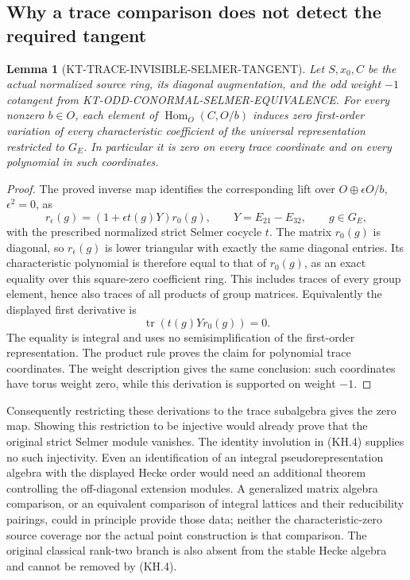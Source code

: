 \documentclass[11pt,a4paper]{article}
\newtheorem{lemma}[theorem]{Lemma}
\theoremstyle{definition}
\begin{document}
\subsection{Why a trace comparison does not detect the required tangent}

\begin{lemma}[KT-TRACE-INVISIBLE-SELMER-TANGENT]
Let $S,x_0,C$ be the actual normalized source ring, its diagonal
augmentation, and the odd weight $-1$ cotangent from
KT-ODD-CONORMAL-SELMER-EQUIVALENCE.  For every nonzero $b\in O$,
each element of $\operatorname{Hom}_O(C,O/b)$ induces zero
first-order variation of every characteristic coefficient of
the universal representation restricted to $G_E$.  In particular
it is zero on every trace coordinate and on every polynomial
in such coordinates.
\end{lemma}
\begin{proof}
The proved inverse map identifies the corresponding lift over
$O\oplus\epsilon O/b$, $\epsilon^2=0$, as
\[
 r_\epsilon(g)=(1+\epsilon t(g)Y)r_0(g),\qquad
 Y=E_{21}-E_{32},\qquad g\in G_E,                           \tag{KH.6}
\]
with the prescribed normalized strict Selmer cocycle $t$.
The matrix $r_0(g)$ is diagonal, so $r_\epsilon(g)$ is lower
triangular with exactly the same diagonal entries.  Its
characteristic polynomial is therefore equal to that of
$r_0(g)$, as an exact equality over this square-zero coefficient
ring.  This includes traces of every group element, hence also
traces of all products of group matrices.  Equivalently the
displayed first derivative is
\[
             \operatorname{tr}(t(g)Y r_0(g))=0.            \tag{KH.7}
\]
The equality is integral and uses no semisimplification of the
first-order representation.  The product rule proves the claim
for polynomial trace coordinates.  The weight description gives
the same conclusion: such coordinates have torus weight zero,
while this derivation is supported on weight $-1$.
\end{proof}

Consequently restricting these derivations to the trace
subalgebra gives the zero map.  Showing this restriction to be
injective would already prove that the original strict Selmer
module vanishes.  The identity involution in (KH.4) supplies no
such injectivity.  Even an identification of an integral
pseudorepresentation algebra with the displayed Hecke order
would need an additional theorem controlling the off-diagonal
extension modules.  A generalized matrix algebra comparison,
or an equivalent comparison of integral lattices and their
reducibility pairings, could in principle provide those data;
neither the characteristic-zero source coverage nor the actual
point construction is that comparison.  The original classical
rank-two branch is also absent from the stable Hecke algebra and
cannot be removed by (KH.4).
\end{document}
